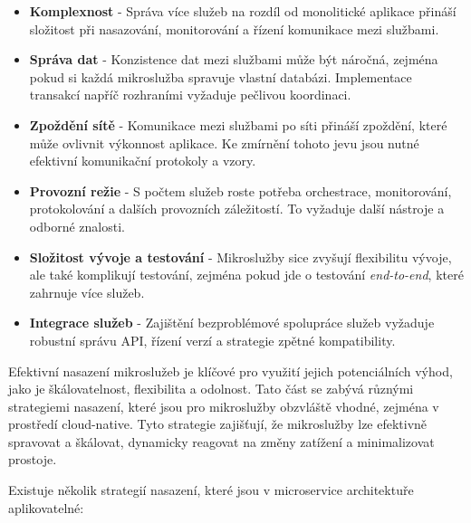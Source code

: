 \begin{itemize}

\item \textbf{Komplexnost} - Správa více služeb na rozdíl od monolitické aplikace přináší složitost při nasazování, monitorování a řízení komunikace mezi službami.

\item \textbf{Správa dat} - Konzistence dat mezi službami může být náročná, zejména pokud si každá mikroslužba spravuje vlastní databázi. Implementace transakcí napříč rozhraními vyžaduje pečlivou koordinaci.

\item \textbf{Zpoždění sítě} - Komunikace mezi službami po síti přináší zpoždění, které může ovlivnit výkonnost aplikace. Ke zmírnění tohoto jevu jsou nutné efektivní komunikační protokoly a vzory.

\item \textbf{Provozní režie} - S počtem služeb roste potřeba orchestrace, monitorování, protokolování a dalších provozních záležitostí. To vyžaduje další nástroje a odborné znalosti.

\item \textbf{Složitost vývoje a testování} - Mikroslužby sice zvyšují flexibilitu vývoje, ale také komplikují testování, zejména pokud jde o testování \emph{end-to-end}, které zahrnuje více služeb.

\item \textbf{Integrace služeb} - Zajištění bezproblémové spolupráce služeb vyžaduje robustní správu API, řízení verzí a strategie zpětné kompatibility.

\end{itemize}


Efektivní nasazení mikroslužeb je klíčové pro využití jejich potenciálních výhod, jako je škálovatelnost, flexibilita a odolnost. Tato část se zabývá různými strategiemi nasazení, které jsou pro mikroslužby obzvláště vhodné, zejména v prostředí cloud-native. Tyto strategie zajišťují, že mikroslužby lze efektivně spravovat a škálovat, dynamicky reagovat na změny zatížení a minimalizovat prostoje. \cite{Williams2023}


Existuje několik strategií nasazení, které jsou v microservice architektuře aplikovatelné:

